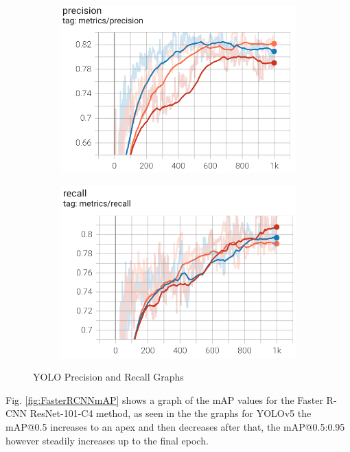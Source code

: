 \documentclass[conference]{IEEEtran}
\begin{document}
\begin{figure}[H]
\centering
\begin{subfigure}{.2\textwidth}
    \centering
    \includegraphics[width=1\linewidth]{Images/Precission.png}
\end{subfigure}%
\begin{subfigure}{.2\textwidth}
    \centering
    \includegraphics[width=1\linewidth]{Images/Recall.png}
\end{subfigure}
\caption{YOLO Precision and Recall Graphs}
\label{fig:yolopr}
\end{figure}

Fig. \ref{fig:FasterRCNNmAP} shows a graph of the mAP values for the Faster R-CNN ResNet-101-C4 method, as seen in the the graphs for YOLOv5 the mAP@0.5 increases to an apex and then decreases after that, the mAP@0.5:0.95 however steadily increases up to the final epoch.
\end{document}
